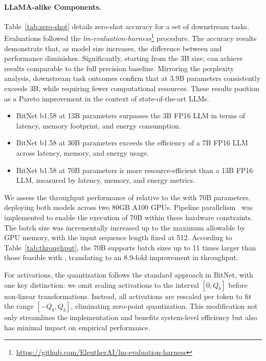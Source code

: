 \paragraph{LLaMA-alike Components.}

Table~\ref{tab:zero-shot} details zero-shot accuracy for a set of downstream tasks. Evaluations followed the \emph{lm-evaluation-harness}\footnote{\url{https://github.com/EleutherAI/lm-evaluation-harness}} procedure. The accuracy results demonstrate that, as model size increases, the difference between  and  performance diminishes. Significantly, starting from the 3B size,  can achieve results comparable to the full precision baseline. Mirroring the perplexity analysis, downstream task outcomes confirm that  at 3.9B parameters consistently exceeds  3B, while requiring fewer computational resources. These results position  as a Pareto improvement in the context of state-of-the-art LLMs.

\begin{itemize}
    \item BitNet b1.58 at 13B parameters surpasses the 3B FP16 LLM in terms of latency, memory footprint, and energy consumption.
    \item BitNet b1.58 at 30B parameters exceeds the efficiency of a 7B FP16 LLM across latency, memory, and energy usage.
    \item BitNet b1.58 at 70B parameters is more resource-efficient than a 13B FP16 LLM, measured by latency, memory, and energy metrics.
\end{itemize}

We assess the throughput performance of  relative to the  with 70B parameters, deploying both models across two 80GB A100 GPUs. Pipeline parallelism~\cite{gpipe} was implemented to enable the execution of  70B within these hardware constraints. The batch size was incrementally increased up to the maximum allowable by GPU memory, with the input sequence length fixed at 512. According to Table~\ref{tab:throughput}, the 70B  supports batch sizes up to 11 times larger than those feasible with , translating to an 8.9-fold improvement in throughput.

For activations, the quantization follows the standard approach in BitNet, with one key distinction: we omit scaling activations to the interval $[0, Q_b]$ before non-linear transformations. Instead, all activations are rescaled per token to fit the range $[-Q_b, Q_b]$, eliminating zero-point quantization. This modification not only streamlines the implementation and benefits system-level efficiency but also has minimal impact on empirical performance.

